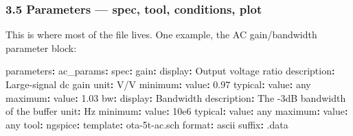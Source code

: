 \documentclass[
]{article}
\newenvironment{Shaded}{}{}
\newcommand{\AttributeTok}[1]{\textcolor[rgb]{0.49,0.56,0.16}{#1}}
\newcommand{\FloatTok}[1]{\textcolor[rgb]{0.25,0.63,0.44}{#1}}
\newcommand{\FunctionTok}[1]{\textcolor[rgb]{0.02,0.16,0.49}{#1}}
\newcommand{\KeywordTok}[1]{\textcolor[rgb]{0.00,0.44,0.13}{\textbf{#1}}}
\begin{document}
\hypertarget{parameters-spec-tool-conditions-plot}{%
\subsubsection{3.5 Parameters --- spec, tool, conditions,
plot}\label{parameters-spec-tool-conditions-plot}}

This is where most of the file lives. One example, the AC gain/bandwidth
parameter block:

\begin{Shaded}
\begin{Highlighting}[]
\FunctionTok{parameters}\KeywordTok{:}
\AttributeTok{  }\FunctionTok{ac\_params}\KeywordTok{:}
\AttributeTok{    }\FunctionTok{spec}\KeywordTok{:}
\AttributeTok{      }\FunctionTok{gain}\KeywordTok{:}
\AttributeTok{        }\FunctionTok{display}\KeywordTok{:}\AttributeTok{ Output voltage ratio}
\AttributeTok{        }\FunctionTok{description}\KeywordTok{:}\AttributeTok{ Large{-}signal dc gain}
\AttributeTok{        }\FunctionTok{unit}\KeywordTok{:}\AttributeTok{ V/V}
\AttributeTok{        }\FunctionTok{minimum}\KeywordTok{:}
\AttributeTok{          }\FunctionTok{value}\KeywordTok{:}\AttributeTok{ }\FloatTok{0.97}
\AttributeTok{        }\FunctionTok{typical}\KeywordTok{:}
\AttributeTok{          }\FunctionTok{value}\KeywordTok{:}\AttributeTok{ any}
\AttributeTok{        }\FunctionTok{maximum}\KeywordTok{:}
\AttributeTok{          }\FunctionTok{value}\KeywordTok{:}\AttributeTok{ }\FloatTok{1.03}
\AttributeTok{      }\FunctionTok{bw}\KeywordTok{:}
\AttributeTok{        }\FunctionTok{display}\KeywordTok{:}\AttributeTok{ Bandwidth}
\AttributeTok{        }\FunctionTok{description}\KeywordTok{:}\AttributeTok{ The {-}3dB bandwidth of the buffer}
\AttributeTok{        }\FunctionTok{unit}\KeywordTok{:}\AttributeTok{ Hz}
\AttributeTok{        }\FunctionTok{minimum}\KeywordTok{:}
\AttributeTok{          }\FunctionTok{value}\KeywordTok{:}\AttributeTok{ }\FloatTok{10e6}
\AttributeTok{        }\FunctionTok{typical}\KeywordTok{:}
\AttributeTok{          }\FunctionTok{value}\KeywordTok{:}\AttributeTok{ any}
\AttributeTok{        }\FunctionTok{maximum}\KeywordTok{:}
\AttributeTok{          }\FunctionTok{value}\KeywordTok{:}\AttributeTok{ any}
\AttributeTok{    }\FunctionTok{tool}\KeywordTok{:}
\AttributeTok{      }\FunctionTok{ngspice}\KeywordTok{:}
\AttributeTok{        }\FunctionTok{template}\KeywordTok{:}\AttributeTok{ ota{-}5t{-}ac.sch}
\AttributeTok{        }\FunctionTok{format}\KeywordTok{:}\AttributeTok{ ascii}
\AttributeTok{        }\FunctionTok{suffix}\KeywordTok{:}\AttributeTok{ .data}

\end{Highlighting}
\end{Shaded}
\end{document}
